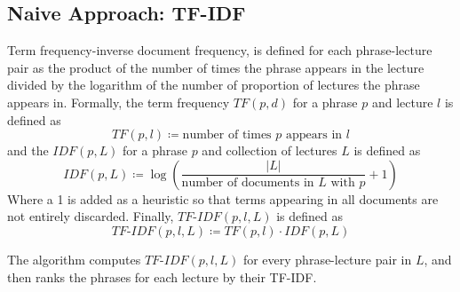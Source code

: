 \subsection{Naive Approach: TF-IDF}
\label{sec:tfidf}



Term frequency-inverse document frequency, is defined for each phrase-lecture pair as the product of the number of times the phrase appears in the lecture divided by the logarithm of the number of proportion of lectures the phrase appears in. Formally, the term frequency $TF(p, d)$ for a phrase $p$ and lecture $l$ is defined as
\begin{equation*}
TF(p, l) \coloneqq \text{number of times } p \text{ appears in } l
\end{equation*}
and the $IDF(p, L)$ for a phrase $p$ and collection of lectures $L$ is defined as
\begin{equation*}
IDF(p, L) \coloneqq \log\left(\frac{|L|}{\text{number of documents in } L \text{ with } p} + 1\right)
\end{equation*}
Where a 1 is added as a heuristic so that terms appearing in all documents are not entirely discarded. Finally, $TF\text{-}IDF(p, l, L)$ is defined as
\begin{equation*}
TF\text{-}IDF(p, l, L) \coloneqq TF(p, l) \cdot IDF(p, L)
\end{equation*}

The algorithm computes $TF\text{-}IDF(p, l, L)$ for every phrase-lecture pair in $L$, and then ranks the phrases for each lecture by their TF-IDF.
